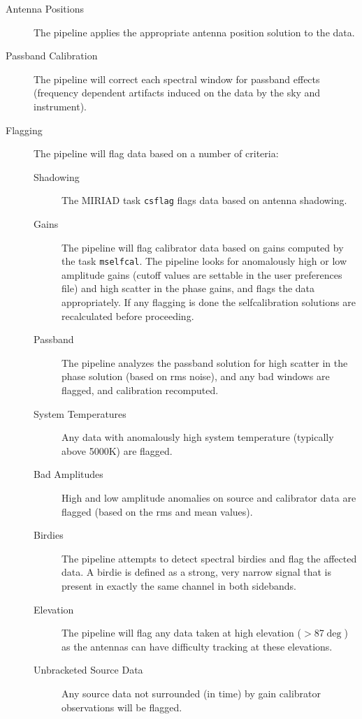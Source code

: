 \begin{description}
\item[Antenna Positions] The pipeline applies the appropriate antenna position solution to the data.
\item[Passband Calibration] The pipeline will correct each spectral window for passband effects (frequency dependent artifacts induced on the data by the sky and instrument).
\item[Flagging] The pipeline will flag data based on a number of criteria:
\begin{description}
\item[Shadowing] The MIRIAD task \verb#csflag# flags data based on antenna shadowing.
\item[Gains] The pipeline will flag calibrator data based on gains computed by the task \verb#mselfcal#. The pipeline looks for anomalously high or low amplitude gains (cutoff values are settable in the user preferences file) and high scatter in the phase gains, and flags the data appropriately. If any flagging is done the selfcalibration solutions are recalculated before proceeding.
\item[Passband] The pipeline analyzes the passband solution for high scatter in the phase solution (based on rms noise), and any bad windows are flagged, and calibration recomputed.
\item[System Temperatures] Any data with anomalously high system temperature (typically above 5000K) are flagged.
\item[Bad Amplitudes] High and low amplitude anomalies on source and calibrator data are flagged (based on the rms and mean values).
\item[Birdies] The pipeline attempts to detect spectral birdies and flag the affected data. A birdie is defined as a strong, very narrow signal that is present in exactly the same channel in both sidebands.
\item[Elevation] The pipeline will flag any data taken at high elevation ($>$87$\deg$) as the antennas can have difficulty tracking at these elevations.
\item[Unbracketed Source Data] Any source data not surrounded (in time) by gain calibrator observations will be flagged.

\end{description}
\end{description}
